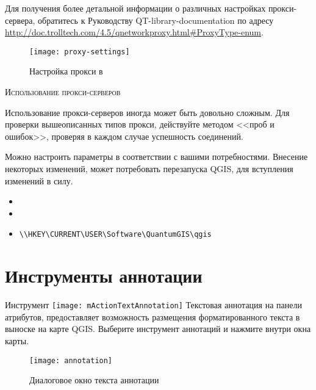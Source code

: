 Для получения более детальной информации о различных настройках прокси-сервера, обратитесь к Руководству  QT-library-documentation по адресу \url{http://doc.trolltech.com/4.5/qnetworkproxy.html#ProxyType-enum}.

\begin{figure}[ht]
   \centering
   \texttt{[image: proxy-settings]}
   \caption{Настройка прокси в \qg \nixcaption}
   \label{fig:proxy-settings}
\end{figure}

\begin{Tip} \caption{\textsc{Использование прокси-серверов}}
Использование прокси-серверов иногда может быть довольно сложным. Для проверки вышеописанных типов прокси, действуйте методом <<проб и ошибок>>, проверяя в каждом случае успешность соединений.
\end{Tip}

Можно настроить параметры в соответствии с вашими потребностями. Внесение некоторых изменений, может потребовать перезапуска QGIS, для вступления изменений в силу.

\begin{itemize}
\item {}
\item {}
\item {}
\begin{verbatim}
\\HKEY\CURRENT\USER\Software\QuantumGIS\qgis
\end{verbatim}
\end{itemize}

\section{Инструменты аннотации}\label{sec:annotations}

Инструмент \texttt{[image: mActionTextAnnotation]} Текстовая аннотация на панели атрибутов, предоставляет возможность размещения форматированного текста в выноске на карте QGIS. Выберите инструмент аннотаций и нажмите внутри окна карты.

\begin{figure}[ht]
   \centering
   \texttt{[image: annotation]}
   \caption{Диалоговое окно текста аннотации \nixcaption}
   \label{fig:annotation}
\end{figure}

